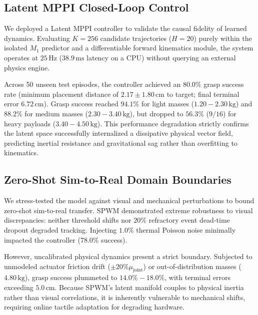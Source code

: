 \documentclass{article}
\begin{document}
\begin{table}[h]
\centering
\caption{[INSERT TABLE: Hardware Energy and SOP Profiling. Compare SPWM-v0.7.3, ANN-Rate, Continuous RSSM, and ConvLSTM across parameters, sparsity, FLOPs/SOPs per step, and resulting Energy per step.]}
\label{tab:energy_efficiency}
\end{table}

\subsection{Latent MPPI Closed-Loop Control}
We deployed a Latent MPPI controller \cite{williams2017information} to validate the causal fidelity of learned dynamics. Evaluating $K=256$ candidate trajectories ($H=20$) purely within the isolated $M_1$ predictor and a differentiable forward kinematics module, the system operates at $25\,\text{Hz}$ ($38.9\,\text{ms}$ latency on a CPU) without querying an external physics engine.

Across 50 unseen test episodes, the controller achieved an $80.0\%$ grasp success rate (minimum placement distance of $2.17 \pm 1.80\,\text{cm}$ to target; final terminal error $6.72\,\text{cm}$). Grasp success reached $94.1\%$ for light masses ($1.20 - 2.30\,\text{kg}$) and $88.2\%$ for medium masses ($2.30 - 3.40\,\text{kg}$), but dropped to $56.3\%$ ($9/16$) for heavy payloads ($3.40 - 4.50\,\text{kg}$). This performance degradation strictly confirms the latent space successfully internalized a dissipative physical vector field, predicting inertial resistance and gravitational sag rather than overfitting to kinematics.

\subsection{Zero-Shot Sim-to-Real Domain Boundaries}
We stress-tested the model against visual and mechanical perturbations to bound zero-shot sim-to-real transfer. SPWM demonstrated extreme robustness to visual discrepancies: neither threshold shifts nor $20\%$ refractory event dead-time dropout degraded tracking. Injecting $1.0\%$ thermal Poisson noise minimally impacted the controller (78.0\% success). 

However, uncalibrated physical dynamics present a strict boundary. Subjected to unmodeled actuator friction drift ($\pm 20\% \mu_{\text{joint}}$) or out-of-distribution masses ($4.80\,\text{kg}$), grasp success plummeted to $14.0\% - 18.0\%$, with terminal errors exceeding $5.0\,\text{cm}$. Because SPWM's latent manifold couples to physical inertia rather than visual correlations, it is inherently vulnerable to mechanical shifts, requiring online tactile adaptation for degrading hardware.
\end{document}
